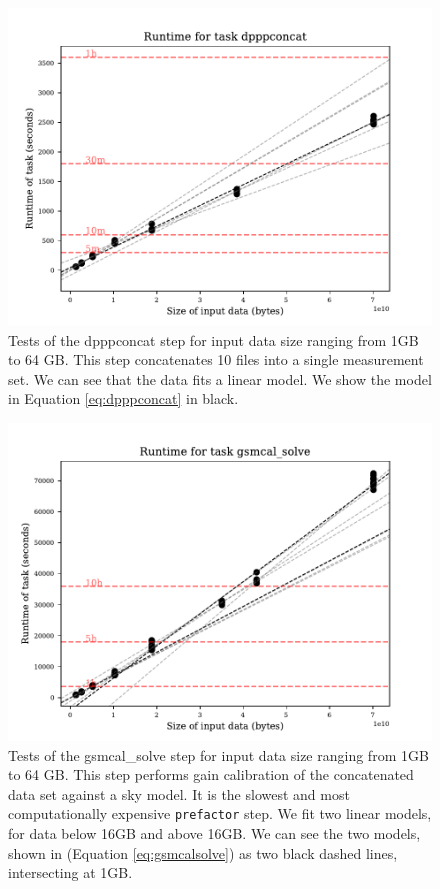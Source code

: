 \documentclass[preprint,5p]{elsarticle}
\begin{document}
\begin{figure}
    \includegraphics[width=0.95\linewidth]{figures/dpppconcat_size.pdf}
      \caption{Tests of the {\selectfont dpppconcat} step for input data size ranging from 1GB to 64 GB. This step concatenates 10 files into a single measurement set.  We can see that the data fits a linear model. We show the model in Equation \ref{eq:dpppconcat}  in black.}
	\label{fig:dpppconcat_size}
\end{figure}

\begin{figure}
    \includegraphics[width=0.95\linewidth]{figures/gsmcal_solve_size2.pdf}
      \cprotect\caption{Tests of the {\selectfont gsmcal\_solve} step for input data size ranging from 1GB to 64 GB. This step performs gain calibration of the concatenated data set against a sky model. It is the slowest and most computationally expensive \texttt{prefactor} step. We fit two linear models, for data below 16GB and above 16GB. We can see the two models, shown in  (Equation \ref{eq:gsmcalsolve}) as two black dashed lines, intersecting at 1GB.}
	\label{fig:gsmcalsolve_size}
\end{figure}
\end{document}
